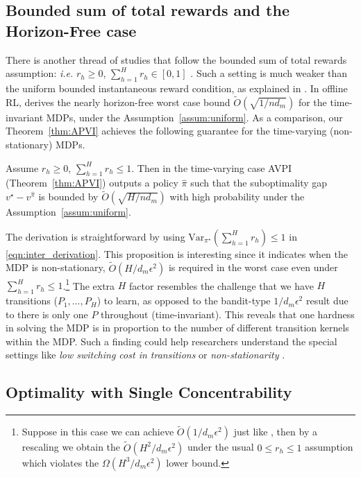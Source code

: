 \subsection{Bounded sum of total rewards and the Horizon-Free case}\label{subsec:btr}
There is another thread of studies that follow the bounded sum of total rewards assumption: \emph{i.e.} $r_h\geq 0$, $\sum_{h=1}^H r_h\in [0,1]$ \citep{krishnamurthy2016pac,jiang2017contextual,zhang2020reinforcement}. Such a setting is much weaker than the uniform bounded instantaneous reward condition, as explained in \cite{jiang2018open}. In offline RL, \cite{ren2021nearly} derives the nearly horizon-free worst case bound $\widetilde{O}(\sqrt{1/nd_m})$ for the time-invariant MDPs, under the Assumption~\ref{assum:uniform}. As a comparison, our Theorem~\ref{thm:APVI} achieves the following guarantee for the time-varying (non-stationary) MDPs.

\begin{proposition}
	Assume $r_h\geq 0$, $\sum_{h=1}^H r_h\leq 1$. Then in the time-varying case AVPI (Theorem~\ref{thm:APVI}) outputs a policy $\widehat{\pi}$ such that the suboptimality gap $v^\star-v^{\widehat{\pi}}$ is bounded by $\widetilde{O}(\sqrt{H/nd_m})$ with high probability under the Assumption~\ref{assum:uniform}. 
\end{proposition}   

The derivation is straightforward by using $\mathrm{Var}_{\pi^\star}(\sum_{h=1}^{H} r_{h})\leq 1$ in \eqref{eqn:inter_derivation}. This proposition is interesting since it indicates when the MDP is non-stationary, $\widetilde{O}(H/d_m\epsilon^2)$ is required in the worst case even under $\sum_{h=1}^H r_h\leq 1$.\footnote{Suppose in this case we can achieve $\widetilde{O}(1/d_m\epsilon^2)$ just like \cite{ren2021nearly}, then by a rescaling we obtain the $\widetilde{O}(H^2/d_m\epsilon^2)$ under the usual $0\leq r_h\leq 1$ assumption which violates the $\Omega(H^3/d_m\epsilon^2)$ lower bound.} The extra $H$ factor resembles the challenge that we have $H$ transitions ($P_1,\ldots,P_H$) to learn, as opposed to the bandit-type $1/d_m\epsilon^2$ result due to there is only one $P$ throughout (time-invariant). This reveals that one hardness in solving the MDP is in proportion to the number of different transition kernels within the MDP. Such a finding could help researchers understand the special settings like \emph{low switching cost in transitions} \citep{bai2019provably} or \emph{non-stationarity} \citep{cheung2020reinforcement}.

\subsection{Optimality with Single Concentrability}\label{subsec:two}

